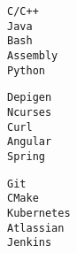\documentclass[9pt]{developercv} %
\begin{document}
\vspace{0.5cm}

\begin{minipage}[t]{0.3\textwidth}
	\vspace{-\baselineskip} %


	{\texttt{C/C++}\\\texttt{Java}\\\texttt{Bash}\\\texttt{Assembly}\\\texttt{Python}}
\end{minipage}
\hfill
\begin{minipage}[t]{0.3\textwidth}
	\vspace{-\baselineskip} %
	
	
	{\texttt{Depigen}\\\texttt{Ncurses}\\\texttt{Curl}\\\texttt{Angular}\\\texttt{Spring}}
\end{minipage}
\hfill
\begin{minipage}[t]{0.3\textwidth}
	\vspace{-\baselineskip} %
	
	
	{\texttt{Git}\\\texttt{CMake}\\\texttt{Kubernetes}\\\texttt{Atlassian}\\\texttt{Jenkins}}
\end{minipage}


\end{document}
